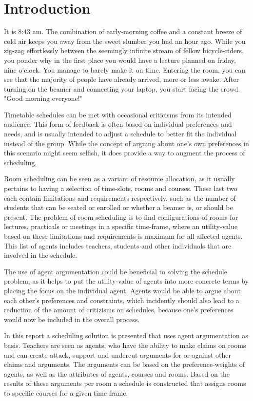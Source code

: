 \section{Introduction}
It is 8:43 am. The combination of early-morning coffee and a constant breeze of cold air keeps you away from the sweet slumber you had an hour ago. While you zig-zag effortlessly between the seemingly infinite stream of fellow bicycle-riders, you ponder why in the first place you would have a lecture planned on friday, nine o'clock. You manage to barely make it on time. Entering the room, you can see that the majority of people have already arrived, more or less awake. After turning on the beamer and connecting your laptop, you start facing the crowd. "Good morning everyone!"    

Timetable schedules can be met with occasional criticisms from its intended audience. This form of feedback is often based on individual preferences and needs, and is usually intended to adjust a schedule to better fit the individual instead of the group. While the concept of arguing about one's own preferences in this scenario might seem selfish, it does provide a way to augment the process of scheduling.

Room scheduling can be seen as a variant of resource allocation, as it usually pertains to having a selection of time-slots, rooms and courses. These last two each contain limitations and requirements respectively, such as the number of students that can be seated or enrolled or whether a beamer is, or should be present. The problem of room scheduling is to find configurations of rooms for lectures, practicals or meetings in a specific time-frame, where an utility-value based on these limitations and requirements is maximum for all affected agents. This list of agents includes teachers, students and other individuals that are involved in the schedule.            

The use of agent argumentation could be beneficial to solving the schedule problem, as it helps to put the utility-value of agents into more concrete terms by placing the focus on the individual agent. Agents would be able to argue about each other's preferences and constraints, which incidently should also lead to a reduction of the amount of critizisms on schedules, because one's preferences would now be included in the overall process. 

In this report a scheduling solution is presented that uses agent argumentation as basis. Teachers are seen as agents, who have the ability to make claims on rooms and can create attack, support and undercut arguments for or against other claims and arguments. The arguments can be based on the preference-weights of agents, as well as the attributes of agents, courses and rooms. Based on the results of these arguments per room a schedule is constructed that assigns rooms to specific courses for a given time-frame.
